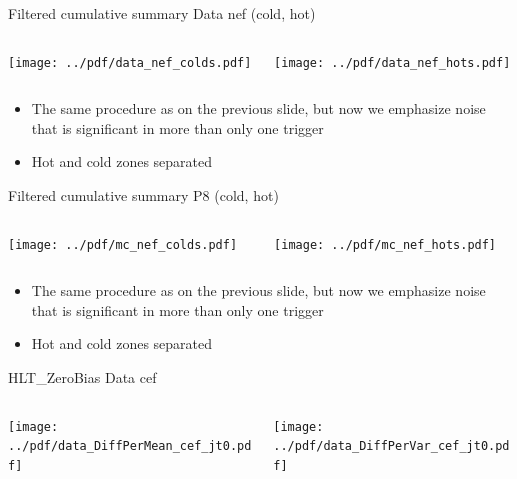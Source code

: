 \documentclass[9pt]{beamer}
\begin{document}
\begin{frame}[t]{Filtered cumulative summary Data nef (cold, hot)}
\begin{columns}[T]
  \begin{column}{.5\textwidth}
  \texttt{[image: ../pdf/data\_nef\_colds.pdf]}
  \end{column}
  \begin{column}{.5\textwidth}
  \texttt{[image: ../pdf/data\_nef\_hots.pdf]}
  \end{column}
\end{columns}
\begin{itemize}
 \item The same procedure as on the previous slide, but now we emphasize noise that is significant in more than only one trigger
 \item Hot and cold zones separated
\end{itemize}
\end{frame}

\begin{frame}[t]{Filtered cumulative summary P8 (cold, hot)}
\begin{columns}[T]
  \begin{column}{.5\textwidth}
  \texttt{[image: ../pdf/mc\_nef\_colds.pdf]}
  \end{column}
  \begin{column}{.5\textwidth}
  \texttt{[image: ../pdf/mc\_nef\_hots.pdf]}
  \end{column}
\end{columns}
\begin{itemize}
 \item The same procedure as on the previous slide, but now we emphasize noise that is significant in more than only one trigger
 \item Hot and cold zones separated
\end{itemize}
\end{frame}


\begin{frame}[t]{HLT\_ZeroBias Data cef}
\begin{columns}[T]
  \begin{column}{.5\textwidth}
  \texttt{[image: ../pdf/data\_DiffPerMean\_cef\_jt0.pdf]}
  \end{column}
  \begin{column}{.5\textwidth}
  \texttt{[image: ../pdf/data\_DiffPerVar\_cef\_jt0.pdf]}
  \end{column}
\end{columns}
\end{frame}
\end{document}
